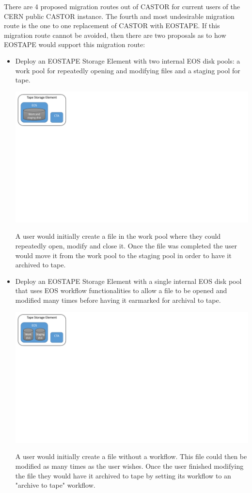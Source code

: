 \documentclass{article}
\begin{document}
There are 4 proposed migration routes out of CASTOR for current users of the CERN public CASTOR instance.  The fourth and most undesirable migration route is the one to one replacement of CASTOR with EOSTAPE.  If this migration route cannot be avoided, then there are two proposals as to how EOSTAPE would support this migration route:
\begin{itemize}
	\item Deploy an EOSTAPE Storage Element with two internal EOS disk pools: a work pool for repeatedly opening and modifying files and a staging pool for tape.
	
	\includegraphics[width=\linewidth,trim=0mm 140mm 0mm 0mm]{EOSTAPE_public_1_pool}
	
	A user would initially create a file in the work pool where they could repeatedly open, modify and close it.  Once the file was completed the user would move it from the work pool to the staging pool in order to have it archived to tape.
	\item Deploy an EOSTAPE Storage Element with a single internal EOS disk pool that uses EOS workflow functionalities to allow a file to be opened and modified many times before having it earmarked for archival to tape.
	
	\includegraphics[width=\linewidth,trim=0mm 140mm 0mm 0mm]{EOSTAPE_public_2_pools}
	
	A user would initially create a file without a workflow.  This file could then be modified as many times as the user wishes.  Once the user finished modifying the file they would have it archived to tape by setting its workflow to an "archive to tape" workflow.
\end{itemize}
\end{document}
